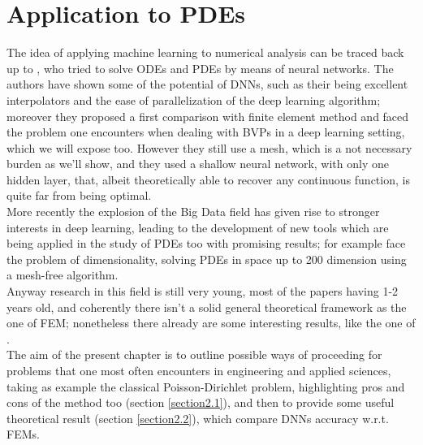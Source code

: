 \documentclass[12pt, a4paper]{report}
\theoremstyle{definition}
\begin{document}
{\chapter{Application to PDEs}\label{chapter2}
\setcounter{figure}{5}
The idea of applying machine learning to numerical analysis can be traced back up to \cite{Lagaris}, who tried to solve ODEs and PDEs by means of neural networks. The authors have shown some of the potential of DNNs, such as their being excellent interpolators and the ease of parallelization of the deep learning algorithm; moreover they proposed a first comparison with finite element method and faced the problem one encounters when dealing with BVPs in a deep learning setting, which we will expose too. However they still use a mesh, which is a not necessary burden as we'll show, and they used a shallow neural network, with only one hidden layer, that, albeit theoretically able to recover any continuous function, is quite far from being optimal.\\
More recently the explosion of the Big Data field has given rise to stronger interests in deep learning, leading to the development of new tools which are being applied in the study of PDEs too with promising results; for example \cite{Sirignano} face the problem of dimensionality, solving PDEs in space up to 200 dimension using a mesh-free algorithm.\\
Anyway research in this field is still very young, most of the papers having 1-2 years old, and coherently there isn't a solid general theoretical framework as the one of FEM; nonetheless there already are some interesting results, like the one of \cite{Jinchao}.\\
The aim of the present chapter is to outline possible ways of proceeding for problems that one most often encounters in engineering and applied sciences, taking as example the classical Poisson-Dirichlet problem, highlighting pros and cons of the method too (section \ref{section2.1}), and then to provide some useful theoretical result (section \ref{section2.2}), which compare DNNs accuracy w.r.t. FEMs.

}
\end{document}
